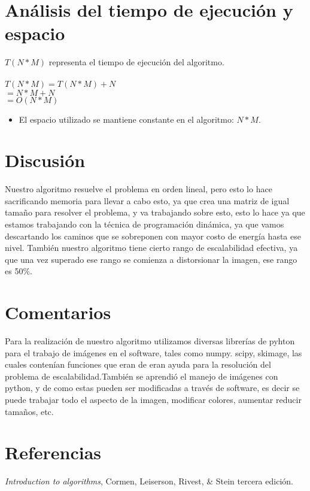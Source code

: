 \documentclass[twocolumn,11pts]{IEEEtran}
\begin{document}
\section{Análisis del tiempo de ejecución y espacio}
$T(N*M)$ representa el tiempo de ejecución del algoritmo.\\\\

$T(N*M)= T(N*M)+N$ \\
$      = N*M+N$\\
$      = O(N*M)$\\

\begin{itemize}
\item El espacio utilizado se mantiene constante en el algoritmo: $N*M$.
\end{itemize} 
\section{Discusión}
Nuestro algoritmo resuelve el problema en orden lineal, pero esto lo hace sacrificando memoria para llevar a cabo esto, ya que crea una matriz de igual tamaño para resolver el problema, y va trabajando sobre esto, esto lo hace ya que estamos trabajando con la técnica de programación dinámica, ya que vamos descartando los caminos que se sobreponen con mayor costo de energía hasta ese nivel. También nuestro algoritmo tiene cierto rango de escalabilidad efectiva, ya que una vez superado ese rango se comienza a distorsionar la imagen, ese rango es 50\%.
\section{Comentarios}
Para la realización de nuestro algoritmo utilizamos diversas librerías de pyhton para el trabajo de imágenes en el software, tales como numpy. scipy, skimage, las cuales contenían funciones que eran de eran ayuda para la resolución del problema de escalabilidad.También se aprendió el manejo de imágenes con python, y de como estas pueden ser modificadas a través de software, es decir se puede trabajar todo el aspecto de la imagen, modificar colores, aumentar reducir tamaños, etc.
\section{Referencias}
\textit {Introduction to algorithms}, Cormen, Leiserson, Rivest, \& Stein tercera edición.

%
%


\end{document}
